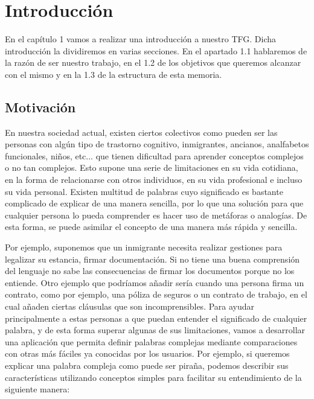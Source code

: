 \chapter{Introducción}
\label{cap:introduccion}




	En el capítulo 1 vamos a realizar una introducción a nuestro TFG. Dicha introducción la dividiremos en varias secciones. En el apartado 1.1 hablaremos de la razón de ser nuestro trabajo, en el 1.2 de los objetivos que queremos alcanzar con el mismo y en la 1.3 de la estructura de esta memoria.



\section{Motivación}
\label{cap:sec:motivacion}
En nuestra sociedad actual, existen ciertos colectivos como pueden ser las personas con algún tipo de trastorno cognitivo, inmigrantes, ancianos, analfabetos funcionales, niños, etc... que tienen dificultad para aprender conceptos complejos o no tan complejos. Esto supone una serie de limitaciones en su vida cotidiana, en la forma de relacionarse con otros individuos, en su vida profesional e incluso su vida personal.
Existen multitud de palabras cuyo significado es bastante complicado de explicar de una manera sencilla, por lo que una solución para que cualquier persona lo pueda comprender es hacer uso de metáforas o analogías. De esta forma, se puede asimilar el concepto de una manera más rápida y sencilla. 

Por ejemplo, suponemos que un inmigrante necesita realizar gestiones para legalizar su estancia, firmar documentación. Si no tiene una buena comprensión del lenguaje no sabe las consecuencias de firmar los documentos porque no los entiende. 
Otro ejemplo que podríamos añadir sería cuando una persona firma un contrato, como por ejemplo, una póliza de seguros o un contrato de trabajo, en el cual añaden ciertas cláusulas que son incomprensibles. 
\newline
Para ayudar principalmente a estas personas a que puedan entender el significado de cualquier palabra, y de esta forma superar algunas de sus limitaciones, vamos a desarrollar una aplicación que permita definir palabras complejas mediante comparaciones con otras más fáciles ya conocidas por los usuarios. Por ejemplo, si queremos explicar una palabra compleja como puede ser piraña, podemos describir sus características utilizando conceptos simples para facilitar su entendimiento de la siguiente manera: \newline

